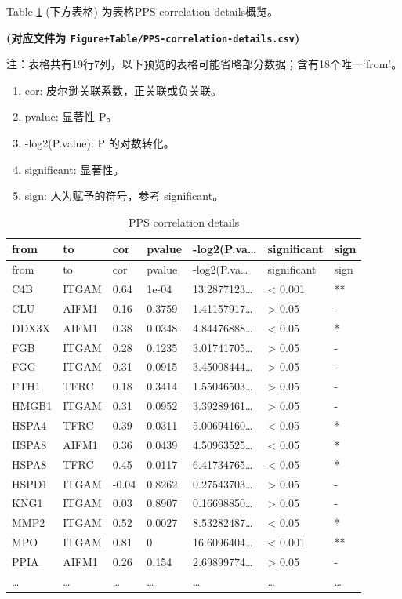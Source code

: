 \documentclass[
]{article}
\providecommand{\tightlist}{%
  \setlength{\itemsep}{0pt}\setlength{\parskip}{0pt}}
\begin{document}
Table \ref{tab:PPS-correlation-details} (下方表格) 为表格PPS correlation details概览。

\textbf{(对应文件为 \texttt{Figure+Table/PPS-correlation-details.csv})}

\begin{center}\begin{tcolorbox}[colback=gray!10, colframe=gray!50, width=0.9\linewidth, arc=1mm, boxrule=0.5pt]注：表格共有19行7列，以下预览的表格可能省略部分数据；含有18个唯一`from'。
\end{tcolorbox}
\end{center}
\begin{center}\begin{tcolorbox}[colback=gray!10, colframe=gray!50, width=0.9\linewidth, arc=1mm, boxrule=0.5pt]\begin{enumerate}\tightlist
\item cor:  皮尔逊关联系数，正关联或负关联。
\item pvalue:  显著性 P。
\item -log2(P.value):  P 的对数转化。
\item significant:  显著性。
\item sign:  人为赋予的符号，参考 significant。
\end{enumerate}\end{tcolorbox}
\end{center}

\begin{longtable}[]{@{}lllllll@{}}
\caption{\label{tab:PPS-correlation-details}PPS correlation details}\tabularnewline
\toprule
from & to & cor & pvalue & -log2(P.va\ldots{} & significant & sign\tabularnewline
\midrule
\endfirsthead
\toprule
from & to & cor & pvalue & -log2(P.va\ldots{} & significant & sign\tabularnewline
\midrule
\endhead
C4B & ITGAM & 0.64 & 1e-04 & 13.2877123\ldots{} & \textless{} 0.001 & **\tabularnewline
CLU & AIFM1 & 0.16 & 0.3759 & 1.41157917\ldots{} & \textgreater{} 0.05 & -\tabularnewline
DDX3X & AIFM1 & 0.38 & 0.0348 & 4.84476888\ldots{} & \textless{} 0.05 & *\tabularnewline
FGB & ITGAM & 0.28 & 0.1235 & 3.01741705\ldots{} & \textgreater{} 0.05 & -\tabularnewline
FGG & ITGAM & 0.31 & 0.0915 & 3.45008444\ldots{} & \textgreater{} 0.05 & -\tabularnewline
FTH1 & TFRC & 0.18 & 0.3414 & 1.55046503\ldots{} & \textgreater{} 0.05 & -\tabularnewline
HMGB1 & ITGAM & 0.31 & 0.0952 & 3.39289461\ldots{} & \textgreater{} 0.05 & -\tabularnewline
HSPA4 & TFRC & 0.39 & 0.0311 & 5.00694160\ldots{} & \textless{} 0.05 & *\tabularnewline
HSPA8 & AIFM1 & 0.36 & 0.0439 & 4.50963525\ldots{} & \textless{} 0.05 & *\tabularnewline
HSPA8 & TFRC & 0.45 & 0.0117 & 6.41734765\ldots{} & \textless{} 0.05 & *\tabularnewline
HSPD1 & ITGAM & -0.04 & 0.8262 & 0.27543703\ldots{} & \textgreater{} 0.05 & -\tabularnewline
KNG1 & ITGAM & 0.03 & 0.8907 & 0.16698850\ldots{} & \textgreater{} 0.05 & -\tabularnewline
MMP2 & ITGAM & 0.52 & 0.0027 & 8.53282487\ldots{} & \textless{} 0.05 & *\tabularnewline
MPO & ITGAM & 0.81 & 0 & 16.6096404\ldots{} & \textless{} 0.001 & **\tabularnewline
PPIA & AIFM1 & 0.26 & 0.154 & 2.69899774\ldots{} & \textgreater{} 0.05 & -\tabularnewline
\ldots{} & \ldots{} & \ldots{} & \ldots{} & \ldots{} & \ldots{} & \ldots{}\tabularnewline
\bottomrule
\end{longtable}
\end{document}
